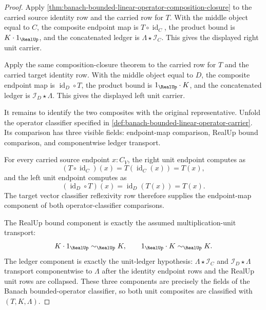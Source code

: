 \begin{proof}
Apply \autoref{thm:banach-bounded-linear-operator-composition-closure} to the carried source identity row and the carried row for $T$. With the middle object equal to $C$, the composite endpoint map is $T\circ\operatorname{id}_C$, the product bound is $K\cdot1_{\RealUp}$, and the concatenated ledger is $\Lambda\star\mathcal{I}_C$. This gives the displayed right unit carrier.

Apply the same composition-closure theorem to the carried row for $T$ and the carried target identity row. With the middle object equal to $D$, the composite endpoint map is $\operatorname{id}_D\circ T$, the product bound is $1_{\RealUp}\cdot K$, and the concatenated ledger is $\mathcal{I}_D\star\Lambda$. This gives the displayed left unit carrier.

It remains to identify the two composites with the original representative. Unfold the operator classifier specified in \autoref{def:banach-bounded-linear-operator-carrier}. Its comparison has three visible fields: endpoint-map comparison, RealUp bound comparison, and componentwise ledger transport.

For every carried source endpoint $x:C_V$, the right unit endpoint computes as
$$
(T\circ\operatorname{id}_C)(x)=T(\operatorname{id}_C(x))=T(x),
$$
and the left unit endpoint computes as
$$
(\operatorname{id}_D\circ T)(x)=\operatorname{id}_D(T(x))=T(x).
$$
The target vector classifier reflexivity row therefore supplies the endpoint-map component of both operator-classifier comparisons.

The RealUp bound component is exactly the assumed multiplication-unit transport:
$$
K\cdot1_{\RealUp}\sim_{\RealUp}K,
\qquad
1_{\RealUp}\cdot K\sim_{\RealUp}K.
$$
The ledger component is exactly the unit-ledger hypothesis: $\Lambda\star\mathcal{I}_C$ and $\mathcal{I}_D\star\Lambda$ transport componentwise to $\Lambda$ after the identity endpoint rows and the RealUp unit rows are collapsed. These three components are precisely the fields of the Banach bounded-operator classifier, so both unit composites are classified with $(T,K,\Lambda)$.
\end{proof}


